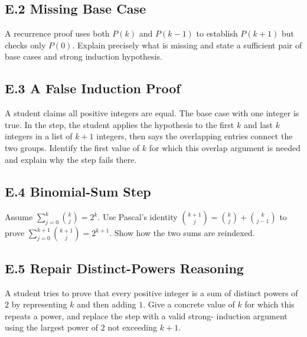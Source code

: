 \documentclass[11pt]{article}
\begin{document}
\subsection*{E.2 Missing Base Case}
A recurrence proof uses both $P(k)$ and $P(k-1)$ to establish $P(k+1)$ but
checks only $P(0)$. Explain precisely what is missing and state a sufficient
pair of base cases and strong induction hypothesis.

\subsection*{E.3 A False Induction Proof}
A student claims all positive integers are equal. The base case with one integer
is true. In the step, the student applies the hypothesis to the first $k$ and
last $k$ integers in a list of $k+1$ integers, then says the overlapping entries
connect the two groups. Identify the first value of $k$ for which this overlap
argument is needed and explain why the step fails there.

\subsection*{E.4 Binomial-Sum Step}
Assume $\sum_{j=0}^{k}\binom{k}{j}=2^k$. Use Pascal's identity
$\binom{k+1}{j}=\binom{k}{j}+\binom{k}{j-1}$ to prove
$\sum_{j=0}^{k+1}\binom{k+1}{j}=2^{k+1}$. Show how the two sums are reindexed.

\subsection*{E.5 Repair Distinct-Powers Reasoning}
A student tries to prove that every positive integer is a sum of distinct
powers of $2$ by representing $k$ and then adding $1$. Give a concrete value
of $k$ for which this repeats a power, and replace the step with a valid strong-
induction argument using the largest power of $2$ not exceeding $k+1$.
\end{document}
